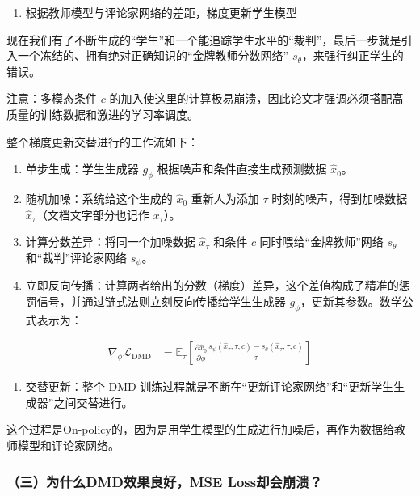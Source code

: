 \begin{enumerate}
\def\labelenumi{\arabic{enumi}.}
\setcounter{enumi}{1}
\tightlist
\item
  根据教师模型与评论家网络的差距，梯度更新学生模型
\end{enumerate}

现在我们有了不断生成的``学生''和一个能追踪学生水平的``裁判''，最后一步就是引入一个冻结的、拥有绝对正确知识的``金牌教师分数网络'' \(s_\theta\)，来强行纠正学生的错误。

注意：多模态条件 \(c\) 的加入使这里的计算极易崩溃，因此论文才强调必须搭配高质量的训练数据和激进的学习率调度。

整个梯度更新交替进行的工作流如下：

\begin{enumerate}
\def\labelenumi{\arabic{enumi}.}
\tightlist
\item
  单步生成：学生生成器 \(g_\phi\) 根据噪声和条件直接生成预测数据 \(\hat{x}_0\)。
\item
  随机加噪：系统给这个生成的 \(\hat{x}_0\) 重新人为添加 \(\tau\) 时刻的噪声，得到加噪数据 \(\hat{x}_\tau\)（文档文字部分也记作 \(x_\tau\)）。
\item
  计算分数差异：将同一个加噪数据 \(\hat{x}_\tau\) 和条件 \(c\) 同时喂给``金牌教师''网络 \(s_\theta\) 和``裁判''评论家网络 \(s_\psi\)。
\item
  立即反向传播：计算两者给出的分数（梯度）差异，这个差值构成了精准的惩罚信号，并通过链式法则立刻反向传播给学生生成器 \(g_\phi\)，更新其参数。数学公式表示为：
\end{enumerate}

\[
\begin{aligned}
\nabla_\phi\mathcal{L}_{\mathrm{DMD}}
&=\mathbb{E}_{\tau}\left[
\frac{\partial\hat{x}_0}{\partial\phi}
\frac{s_\psi(\hat{x}_\tau,\tau,c)-s_\theta(\hat{x}_\tau,\tau,c)}{\tau}
\right]
\end{aligned}
\]

\begin{enumerate}
\def\labelenumi{\arabic{enumi}.}
\setcounter{enumi}{4}
\tightlist
\item
  交替更新：整个 DMD 训练过程就是不断在``更新评论家网络''和``更新学生生成器''之间交替进行。
\end{enumerate}

这个过程是On-policy的，因为是用学生模型的生成进行加噪后，再作为数据给教师模型和评论家网络。

\hypertarget{ux4e09ux4e3aux4ec0ux4e48dmdux6548ux679cux826fux597dmse-lossux5374ux4f1aux5d29ux6e83}{%
\subsubsection{（三）为什么DMD效果良好，MSE Loss却会崩溃？}\label{ux4e09ux4e3aux4ec0ux4e48dmdux6548ux679cux826fux597dmse-lossux5374ux4f1aux5d29ux6e83}}

